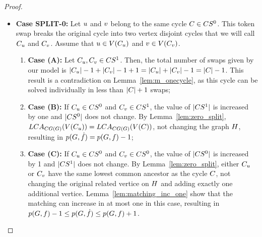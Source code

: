 \documentclass[msc,english,table,xcdraw]{ppgccufmg}
\begin{document}
\begin{proof}
\begin{itemize}
    \item \textbf{Case SPLIT-0:} Let $u$ and $v$ belong to 
    the same cycle $C \in CS^{0}$. 
    This token swap breaks the original cycle into two vertex disjoint cycles that
    we will call $C_{u}$ and $C_{v}$.
    Assume that $u \in V(C_{u})$ and 
    $v \in V(C_{v})$.
    
    \begin{enumerate}
        \item[] \textbf{Case (A):} Let $C_{u},C_{v} \in CS^{1}$.
        Then, the total number of swaps given by our model is $|C_{u}| - 1 + 
        |C_{v}| - 1 + 1 = |C_{u}| + 
        |C_{v}| - 1 = |C| - 1$.
        This result is a contradiction on Lemma~\ref{lem:m_onecycle}, as this cycle
        can be solved individually in less than $|C| + 1$ swaps;
        \item[] \textbf{Case (B):} If $C_{u} \in CS^{0}$ and 
        $C_{v} \in CS^{1}$, the value of $|CS^{1}|$
        is increased by one and $|CS^{0}|$ does not change.
        By Lemma~\ref{lem:zero_split}, $LCA_{CG(G)}(V(C_{u} )) = LCA_{CG(G)}(V(C))$, not changing the graph $H$, resulting
        in $p(G, \dot{f}) = p(G, f) - 1$;
        \item[] \textbf{Case (C):} If $C_{u} \in CS^{0}$ and 
        $C_{v} \in CS^{0}$, the value of $|CS^{0}|$
        is increased by 1 and $|CS^{1}|$ does not change.
        By Lemma~\ref{lem:zero_split}, either $C_{u}$ or $C_{v}$
        have the same lowest common ancestor as the cycle $C$, not changing 
        the original related vertice on $H$ and adding exactly one
        additional vertice.
        Lemma~\ref{lem:matching_inc_one} show that the matching can increase in 
        at most one in this case, resulting in $p(G, f) - 1 
        \leq p(G, \dot{f}) \leq p(G, 
        f) + 1$.
    \end{enumerate}
    

\end{itemize}
\end{proof}
\end{document}
